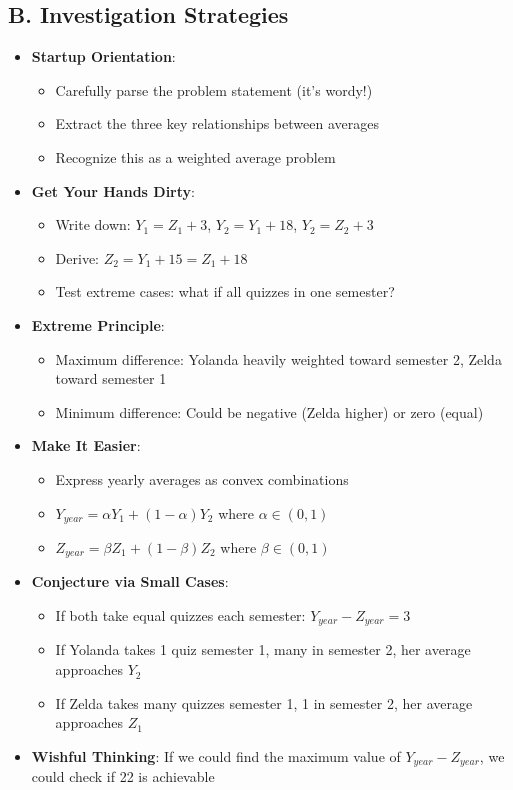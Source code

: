 \documentclass[12pt]{article}
\begin{document}
\begin{strategicbox}
\subsection*{B. Investigation Strategies}
\begin{itemize}[leftmargin=*]
    \item \textbf{Startup Orientation}: 
    \begin{itemize}
        \item Carefully parse the problem statement (it's wordy!)
        \item Extract the three key relationships between averages
        \item Recognize this as a weighted average problem
    \end{itemize}
    \item \textbf{Get Your Hands Dirty}: 
    \begin{itemize}
        \item Write down: $Y_1 = Z_1 + 3$, $Y_2 = Y_1 + 18$, $Y_2 = Z_2 + 3$
        \item Derive: $Z_2 = Y_1 + 15 = Z_1 + 18$
        \item Test extreme cases: what if all quizzes in one semester?
    \end{itemize}
    \item \textbf{Extreme Principle}: 
    \begin{itemize}
        \item Maximum difference: Yolanda heavily weighted toward semester 2, Zelda toward semester 1
        \item Minimum difference: Could be negative (Zelda higher) or zero (equal)
    \end{itemize}
    \item \textbf{Make It Easier}: 
    \begin{itemize}
        \item Express yearly averages as convex combinations
        \item $Y_{year} = \alpha Y_1 + (1-\alpha) Y_2$ where $\alpha \in (0, 1)$
        \item $Z_{year} = \beta Z_1 + (1-\beta) Z_2$ where $\beta \in (0, 1)$
    \end{itemize}
    \item \textbf{Conjecture via Small Cases}: 
    \begin{itemize}
        \item If both take equal quizzes each semester: $Y_{year} - Z_{year} = 3$
        \item If Yolanda takes 1 quiz semester 1, many in semester 2, her average approaches $Y_2$
        \item If Zelda takes many quizzes semester 1, 1 in semester 2, her average approaches $Z_1$
    \end{itemize}
    \item \textbf{Wishful Thinking}: If we could find the maximum value of $Y_{year} - Z_{year}$, we could check if 22 is achievable
\end{itemize}


\end{strategicbox}
\end{document}
